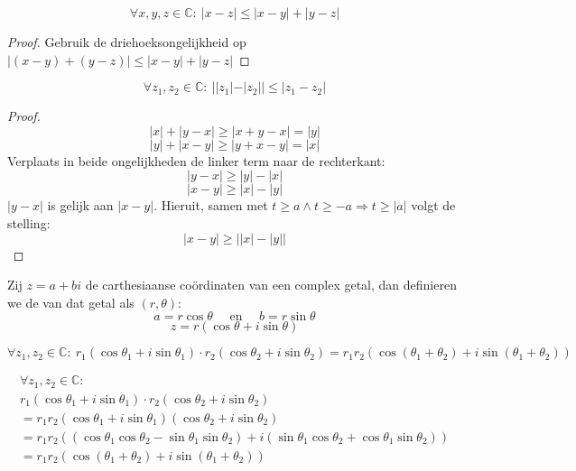 \documentclass[main.tex]{subfiles}
\begin{document}
\begin{pr}
  \label{pr:tweede-driehoeksongelijkheid-C}
  \[ \forall x,y,z\in \mathbb{C}:\ |x-z| \le |x-y| + |y-z| \]

  \begin{proof}
    Gebruik de driehoeksongelijkheid op $|(x-y)+(y-z)| \le |x-y| + |y-z|$
  \end{proof}
\end{pr}

\begin{pr}
  \[ \forall z_{1},z_{2}\in \mathbb{C}:\ ||z_{1}|-|z_{2}|| \le |z_{1}-z_{2}| \]

  \begin{proof}
    \[ |x| + |y-x| \ge |x+y-x| = |y| \]
    \[ |y| + |x-y| \ge |y+x-y| = |x| \]
    Verplaats in beide ongelijkheden de linker term naar de rechterkant:
    \[ |y-x| \ge |y| - |x| \]
    \[ |x-y| \ge |x| - |y| \]
    $|y-x|$ is gelijk aan $|x-y|$. Hieruit, samen met $t \ge a \wedge t \ge -a \Rightarrow t \ge |a|$ volgt de stelling:
    \[ |x-y| \ge \left||x|-|y|\right| \]
  \end{proof}
\end{pr}

\begin{de}
  Zij $z = a+bi$ de carthesiaanse co\"ordinaten van een complex getal, dan definieren we de  van dat getal als $(r,\theta)$:
  \[ a = r \cos \theta \quad\text{ en }\quad b = r\sin \theta \]
  \[ z = r(\cos \theta + i \sin \theta)  \]
\end{de}

\begin{st}
  \label{st:vermenigvuldiging-poolcoordinaten}
  \[
  \forall z_{1},z_{2} \in \mathbb{C}:\ 
  r_{1}(\cos \theta_{1} + i \sin \theta_{1}) \cdot r_{2}(\cos \theta_{2} + i \sin \theta_{2})
  = r_{1}r_{2}\left(\cos(\theta_{1}+\theta_{2}) + i\sin(\theta_{1}+\theta_{2})\right)
  \]
  
  \[ 
  \begin{array}{l}
    \forall z_{1},z_{2} \in \mathbb{C}:\\
    r_{1}(\cos \theta_{1} + i \sin \theta_{1}) \cdot r_{2}(\cos \theta_{2} + i \sin \theta_{2})\\
    = r_{1}r_{2} (\cos \theta_{1} + i \sin \theta_{1})(\cos \theta_{2} + i \sin \theta_{2})\\
    = r_{1}r_{2} \left( \left(\cos \theta_{1}\cos \theta_{2} -\sin \theta_{1}\sin \theta_{2}\right)+ i\left( \sin \theta_{1}\cos \theta_{2} + \cos \theta_{1}\sin \theta_{2}\right)  \right)\\
    = r_{1}r_{2}\left(\cos(\theta_{1}+\theta_{2}) + i\sin(\theta_{1}+\theta_{2})\right)\\
  \end{array}
  \]
\end{st}
\end{document}
